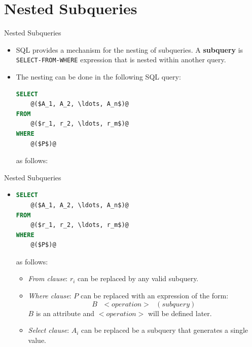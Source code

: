 \documentclass{beamer}
\begin{document}

\section{Nested Subqueries}

\begin{frame}[fragile]{Nested Subqueries}
    \begin{itemize}
        \item SQL provides a mechanism for the nesting of subqueries.  A \textbf{subquery} is \texttt{SELECT-FROM-WHERE} expression that is nested within another query.
        \item The nesting can be done in the following SQL query:
        \begin{lstlisting}[language=SQL]
SELECT
    @($A_1, A_2, \ldots, A_n$)@
FROM
    @($r_1, r_2, \ldots, r_m$)@
WHERE
    @($P$)@
        \end{lstlisting}
        as follows:
    \end{itemize}
\end{frame}

\begin{frame}[fragile]{Nested Subqueries}
    \begin{itemize}
        \item[ ]
        \begin{lstlisting}[language=SQL]
SELECT
    @($A_1, A_2, \ldots, A_n$)@
FROM
    @($r_1, r_2, \ldots, r_m$)@
WHERE
    @($P$)@
        \end{lstlisting}
        as follows:
        \begin{itemize}
            \item \textit{From clause}: $r_i$ can be replaced by any valid subquery.
            \item \textit{Where clause}: $P$ can be replaced with an expression of the form:
            $$
                B \text{ } <operation> \text{ } (subquery)
            $$
            $B$ is an attribute and $<operation>$ will be defined later.
            \item \textit{Select clause}: $A_i$ can be replaced be a subquery that generates a single value.
        \end{itemize}
    \end{itemize}
\end{frame}
\end{document}
